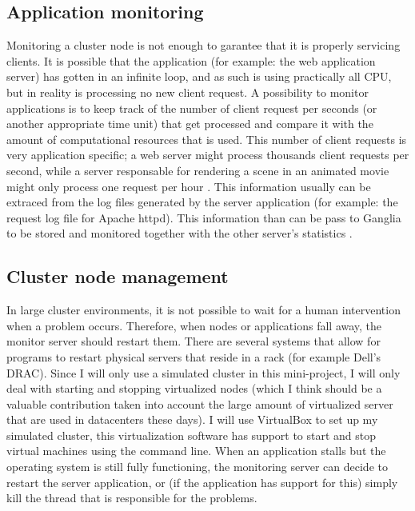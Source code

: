 \documentclass[12pt]{report}
\begin{document}
\subsection{Application monitoring}
Monitoring a cluster node is not enough to garantee that it is
properly servicing clients. It is possible that the application (for
example: the web application server) has gotten in an infinite loop,
and as such is using practically all CPU, but in reality is
processing no new client request.
A possibility to monitor applications is to keep track of the number of
client request per seconds (or another appropriate time unit) that get
processed and compare it with the amount of computational resources
that is used.
This number of client requests is very application specific; a web
server might process thousands client requests per second, while a
server responsable for rendering a scene in an animated movie might only process
one request per hour \cite{apm:2013}.
This information usually can be extraced from the log files generated
by the server application (for example: the request log file for
Apache httpd). This information than can be pass to Ganglia to be
stored and monitored together with the other server's statistics
\cite{ganglia:2013}.

\subsection{Cluster node management}
In large cluster environments, it is not possible to wait for
a human intervention when a problem occurs. Therefore, when nodes or
applications fall away, the monitor server should restart them.
There are several systems that allow for programs to restart
physical servers that reside in a rack (for example Dell's DRAC).
Since I will only use a simulated cluster in this mini-project, I will
only deal with starting and stopping virtualized nodes (which I think should
be a valuable contribution taken into account the large amount of
virtualized server that are used in datacenters these days).
I will use VirtualBox to set up my simulated cluster, this
virtualization software has support to start and stop virtual machines
using the command line.
When an application stalls but the operating system is still fully
functioning, the monitoring server can decide to restart the server application, or
(if the application has support for this) simply kill the thread that
is responsible for the problems.
\end{document}
